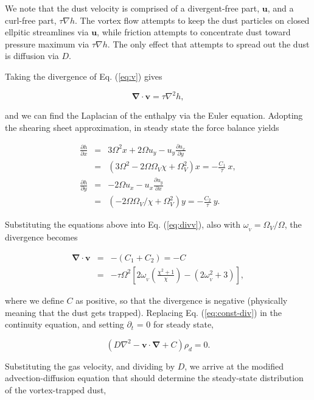 \documentclass[apj]{emulateapj}
\newcommand{\pderiv}[2]{\frac{\partial #1}{\partial #2}}
\renewcommand{\v}[1]{{\boldsymbol{#1}}} %
\newcommand{\del}{\v{\nabla}}
\newcommand{\Div}{\del\cdot}
\newcommand{\Laplace}{\nabla^2}
\newcommand{\Eq}[1]{Eq. (\ref{#1})}
\newcommand{\eq}[1]{\Eq{#1}}
\newcommand{\beq}{\begin{equation}}
\newcommand{\eeq}{\end{equation}}
\newcommand{\beqn}{\begin{eqnarray}}
\newcommand{\eeqn}{\end{eqnarray}}
\begin{document}
We note that the dust
velocity is comprised of a divergent-free part, $\v{u}$, and a
curl-free part, $\tau\nabla{h}$. The vortex flow attempts to keep the
dust particles on closed ellpitic streamlines via $\v{u}$, while friction
attempts to concentrate dust toward pressure maximum via $\tau\nabla
h$. The only effect that attempts to spread out the dust is diffusion
via $D$.  

Taking the divergence of
\eq{eq:v} gives 

\beq
\Div{\v{v}} = \tau \Laplace{h}, 
\label{eq:divv}
\eeq

\noindent and we can find the Laplacian of the enthalpy via the Euler
equation. Adopting the shearing sheet approximation, in steady state
the force balance yields  

\begin{eqnarray}
\pderiv{h}{x} &=& 3\varOmega^2 x + 2\varOmega u_y -
u_y\pderiv{u_x}{y} \nonumber \\
&=& \left(3\varOmega^2 - 2\varOmega\varOmega_V \chi + \varOmega_V^2\right) x
= -\frac{C_1}{\tau} \  x,  \\
\pderiv{h}{y} &=& - 2\varOmega u_x -
u_x\pderiv{u_y}{x} \nonumber \\
&=& \left(-2\varOmega\varOmega_V/\chi + \varOmega_V^2\right) y = -\frac{C_2}{\tau} \  y.
\end{eqnarray}

\noindent  Substituting the equations above into \eq{eq:divv}, also
with $\omega_{_V}=\varOmega_V/\varOmega$, the divergence becomes 

\beqn
\Div{\v{v}} &=& -(C_1+C_2) = - C \label{eq:const-div}\\
&=& - \tau\varOmega^2
\left[2\omega_{_V}\left(\frac{\chi^2+1}{\chi}\right) - (2\omega_{_V}^2
  + 3) \right], 
\label{eq:scale-div}
\eeqn

\noindent where we define $C$ as positive, so that the divergence is negative (physically meaning that the dust gets trapped). Replacing \eq{eq:const-div} in the continuity equation, and setting $\partial_t$ =
0 for steady state, 

\beq
\left(D\Laplace{} -  \v{v}\cdot\del  + C\right)\rho_d = 0. 
\label{eq:steady}
\eeq

Substituting the gas velocity, and dividing by $D$, we
arrive at the modified advection-diffusion equation that should
determine the steady-state distribution of the vortex-trapped dust, 

\end{document}
